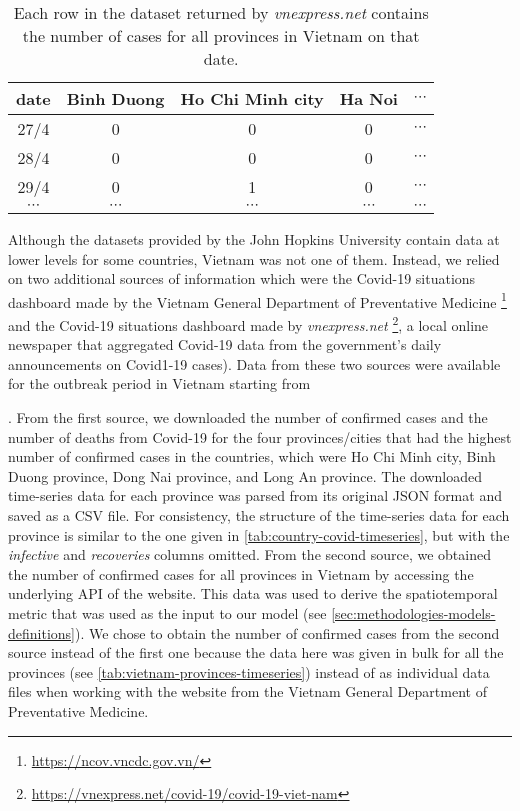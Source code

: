 \begin{table}[h]
\centering
\begin{tabular}{|c | c | c | c | c }
    date & Binh Duong & Ho Chi Minh city & Ha Noi & $\cdots$ \\
    \hline\hline
    27/4 & 0 & 0 & 0 & $\cdots$ \\
    \hline
    28/4 & 0 & 0 & 0 & $\cdots$ \\
    \hline
    29/4 & 0 & 1 & 0 & $\cdots$ \\
    \hline
    $\cdots$ & $\cdots$ & $\cdots$ & $\cdots$ & $\cdots$ \\
\end{tabular}
\caption{Each row in the dataset returned by \textit{vnexpress.net} contains the number of cases for all provinces in Vietnam on that date.}
\label{tab:vietnam-provinces-timeseries}
\end{table}

Although the datasets provided by the John Hopkins University contain data at lower levels for some countries, Vietnam was not one of them.
Instead, we relied on two additional sources of information which were the Covid-19 situations dashboard made by the Vietnam General Department of Preventative Medicine \footnote{\url{https://ncov.vncdc.gov.vn/}} and the Covid-19 situations dashboard made by \textit{vnexpress.net} \footnote{\url{https://vnexpress.net/covid-19/covid-19-viet-nam}}, a local online newspaper that aggregated Covid-19 data from the government's daily announcements on Covid1-19 cases).
Data from these two sources were available for the outbreak period in Vietnam starting from \date{27th April 2021}.
From the first source, we downloaded the number of confirmed cases and the number of deaths from Covid-19 for the four provinces/cities that had the highest number of confirmed cases in the countries, which were Ho Chi Minh city, Binh Duong province, Dong Nai province, and Long An province.
The downloaded time-series data for each province was parsed from its original \gls{JSON} format and saved as a \gls{CSV} file.
For consistency, the structure of the time-series data for each province is similar to the one given in \autoref{tab:country-covid-timeseries}, but with the \textit{infective} and \textit{recoveries} columns omitted.
From the second source, we obtained the number of confirmed cases for all provinces in Vietnam by accessing the underlying \gls{API} of the website.
This data was used to derive the spatiotemporal metric that was used as the input to our model (see \autoref{sec:methodologies-models-definitions}).
We chose to obtain the number of confirmed cases from the second source instead of the first one because the data here was given in bulk for all the provinces (see \autoref{tab:vietnam-provinces-timeseries}) instead of as individual data files when working with the website from the Vietnam General Department of Preventative Medicine.

